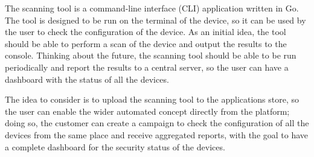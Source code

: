 The scanning tool is a command-line interface (CLI) application written in Go. The tool is designed to be run on the terminal of the device, so it can be used by the user to check the configuration of the device. As an initial idea, the tool should be able to perform a scan of the device and output the results to the console. Thinking about the future, the scanning tool should be able to be run periodically and report the results to a central server, so the user can have a dashboard with the status of all the devices.

The idea to consider is to upload the scanning tool to the applications store, so the user can enable the wider automated concept directly from the platform; doing so, the customer can create a campaign to check the configuration of all the devices from the same place and receive aggregated reports, with the goal to have a complete dashboard for the security status of the devices.
